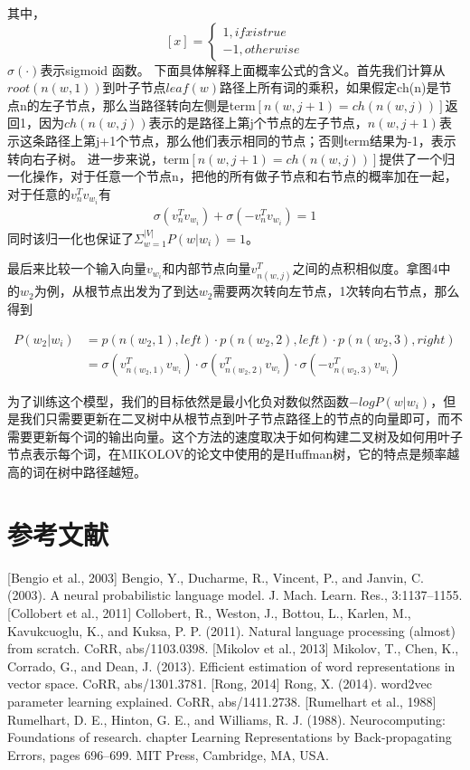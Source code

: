 \documentclass[twoside,nofonts,fancyhdr,openany,UTF8]{ctexbook}
\begin{document}
其中，
$$[x] = \left \{ 
\begin{aligned}
1	,if x is true \\
-1	,otherwise
\end{aligned}
\right.
$$
$\sigma(\cdot)$表示sigmoid 函数。
下面具体解释上面概率公式的含义。首先我们计算从$root(n(w,1))$到叶子节点$leaf(w)$路径上所有词的乘积，如果假定ch(n)是节点n的左子节点，那么当路径转向左侧是term$[n(w,j+1) = ch(n(w,j))]$返回1，因为$ch(n(w,j))$表示的是路径上第j个节点的左子节点，$n(w,j+1)$表示这条路径上第j+1个节点，那么他们表示相同的节点；否则term结果为-1，表示转向右子树。
进一步来说，term$[n(w,j+1) = ch(n(w,j))]$提供了一个归一化操作，对于任意一个节点n，把他的所有做子节点和右节点的概率加在一起，对于任意的$v_{n}^{T}v_{w_i}$有
\begin{align}
\sigma(v_{n}^{T}v_{w_i}) + \sigma(-v_{n}^{T}v_{w_i}) = 1
\end{align}
同时该归一化也保证了$\Sigma_{w=1}^{|V|}P(w|w_i)=1$。

最后来比较一个输入向量$v_{w_i}$和内部节点向量$v_{n(w,j)}^{T}$之间的点积相似度。拿图4中的$w_2$为例，从根节点出发为了到达$w_2$需要两次转向左节点，1次转向右节点，那么得到


\begin{align}
 P(w_2|w_i) & =p(n(w_2,1),left)\cdot p(n(w_2,2),left) \cdot p(n(w_2,3),right)  \\
&= \sigma(v_{n(w_2,1)}^{T}v_{w_i}) \cdot \sigma(v_{n(w_2,2)}^{T}v_{w_i}) \cdot \sigma(-v_{n(w_2,3)}^{T}v_{w_i})
\end{align}

为了训练这个模型，我们的目标依然是最小化负对数似然函数$-logP(w|w_i)$，但是我们只需要更新在二叉树中从根节点到叶子节点路径上的节点的向量即可，而不需要更新每个词的输出向量。这个方法的速度取决于如何构建二叉树及如何用叶子节点表示每个词，在MIKOLOV的论文中使用的是Huffman树，它的特点是频率越高的词在树中路径越短。

\section{参考文献}

[Bengio et al., 2003] Bengio, Y., Ducharme, R., Vincent, P., and Janvin, C. (2003). A
neural probabilistic language model. J. Mach. Learn. Res., 3:1137–1155.
[Collobert et al., 2011] Collobert, R., Weston, J., Bottou, L., Karlen, M., Kavukcuoglu,
K., and Kuksa, P. P. (2011). Natural language processing (almost) from scratch.
CoRR, abs/1103.0398.
[Mikolov et al., 2013] Mikolov, T., Chen, K., Corrado, G., and Dean, J. (2013). Efficient
estimation of word representations in vector space. CoRR, abs/1301.3781.
[Rong, 2014] Rong, X. (2014). word2vec parameter learning explained. CoRR,
abs/1411.2738.
[Rumelhart et al., 1988] Rumelhart, D. E., Hinton, G. E., and Williams, R. J. (1988).
Neurocomputing: Foundations of research. chapter Learning Representations by
Back-propagating Errors, pages 696–699. MIT Press, Cambridge, MA, USA.
\end{document}
